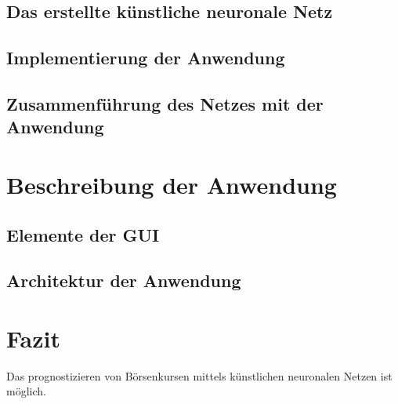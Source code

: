 \documentclass[a4paper,DIV11,bibliography=totoc,headings=normal,ngerman,headsepline,listof=totoc,parskip=half]{scrreprt}
\begin{document}
\section{Das erstellte künstliche neuronale Netz}
\section{Implementierung der Anwendung} %
\section{Zusammenführung des Netzes mit der Anwendung}


\chapter{Beschreibung der Anwendung} %
\section{Elemente der GUI} %
\section{Architektur der Anwendung} %

\chapter{Fazit} %
\label{cha:Fazit}
Das prognostizieren von Börsenkursen mittels künstlichen neuronalen Netzen ist möglich.


\end{document}
